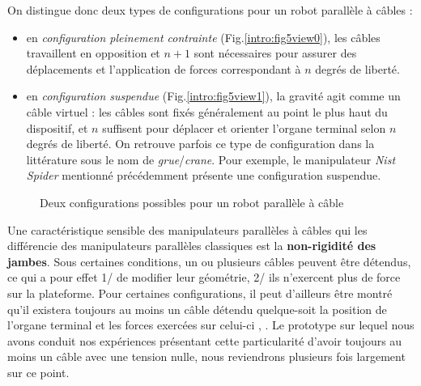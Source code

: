 On distingue donc deux types de configurations pour un robot parallèle à câbles :
\begin{itemize}
 \item en {\it configuration pleinement contrainte} (Fig.\ref{intro:fig5view0}), les câbles travaillent en opposition et $n+1$ sont nécessaires pour assurer des déplacements et l'application de forces correspondant à $n$ degrés de liberté.
 \item en {\it configuration suspendue} (Fig.\ref{intro:fig5view1}), la gravité agit comme un câble virtuel : les câbles sont fixés généralement au point le plus haut du dispositif, et $n$ suffisent pour déplacer et orienter l'organe terminal selon $n$ degrés de liberté. On retrouve parfois ce type de configuration dans la littérature sous le nom de {\it grue}/{\it crane}. Pour exemple, le manipulateur {\it Nist Spider} \cite{1992:Albus.Bostelman.ea} mentionné précédemment présente une configuration suspendue.
\end{itemize}

\begin{figure}[!ht]
  \centering
      \hfill
    \caption{\footnotesize Deux configurations possibles pour un robot parallèle à câble}
\label{intro:fig5}
\end{figure}

Une caractéristique sensible des manipulateurs parallèles à câbles qui les différencie des manipulateurs parallèles classiques est la {\bf non-rigidité des jam\-bes}. Sous certaines conditions, un ou plusieurs câbles peuvent être détendus, ce qui a pour effet 1/ de modifier leur géométrie, 2/ ils n'exercent plus de force sur la plateforme. Pour certaines configurations, il peut d'ailleurs être montré qu'il existera toujours au moins un câble détendu quelque-soit la position de l'organe terminal et les forces exercées sur celui-ci \cite{2011:Carricato.Merlet}, \cite{icra2012:merlet}. Le prototype sur lequel nous avons conduit nos expériences présentant cette particularité d'avoir toujours au moins un câble avec une tension nulle, nous reviendrons plusieurs fois largement sur ce point.

